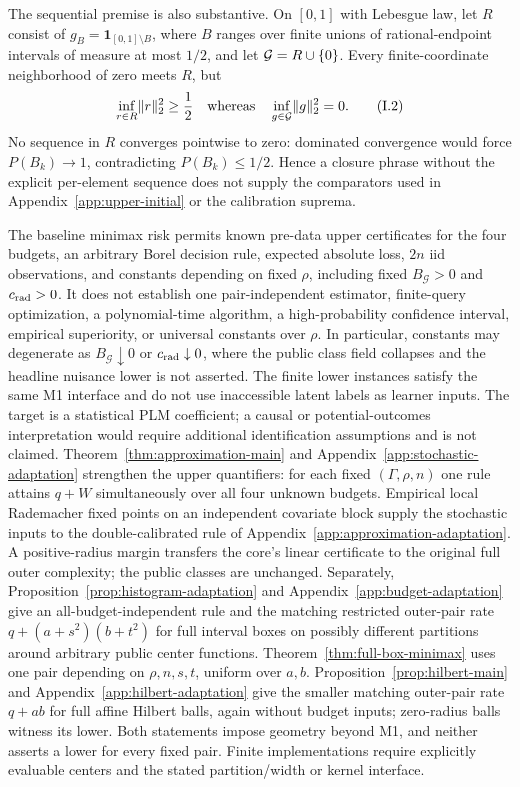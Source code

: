 The sequential premise is also substantive.  On \([0,1]\) with Lebesgue
law, let \(R\) consist of \(g_B=\mathbf 1_{[0,1]\setminus B}\), where \(B\)
ranges over finite unions of rational-endpoint intervals of measure at most
\(1/2\), and let \(\mathcal G=R\cup\{0\}\).  Every finite-coordinate neighborhood
of zero meets \(R\), but
\[
 \inf_{r\in R}\lVert r\rVert_2^2\ge\frac12
 \quad\text{whereas}\quad
 \inf_{g\in\mathcal G}\lVert g\rVert_2^2=0.
 \tag{I.2}
\]
No sequence in \(R\) converges pointwise to zero: dominated convergence would
force \(P(B_k)\to1\), contradicting \(P(B_k)\le1/2\).  Hence a closure phrase
without the explicit per-element sequence does not supply the comparators
used in Appendix~\ref{app:upper-initial} or the calibration suprema.

The baseline minimax risk permits known pre-data upper certificates for the four budgets, an arbitrary Borel decision rule,
expected absolute loss, \(2n\) iid observations, and constants depending on
fixed \(\rho\), including fixed \(B_{\mathcal G}>0\) and
\(c_{\rm rad}>0\).  It does not establish
one pair-independent estimator, finite-query optimization,
a polynomial-time algorithm, a high-probability confidence interval,
empirical superiority, or universal constants over \(\rho\).  In particular,
constants may degenerate as \(B_{\mathcal G}\downarrow0\) or
\(c_{\rm rad}\downarrow0\), where the public class field collapses and the
headline nuisance lower is not asserted.  The finite lower
instances satisfy the same M1 interface and do not use inaccessible latent
labels as learner inputs.  The target is a statistical PLM coefficient; a
causal or potential-outcomes interpretation would require additional
identification assumptions and is not claimed.
Theorem~\ref{thm:approximation-main} and
Appendix~\ref{app:stochastic-adaptation} strengthen the upper quantifiers:
for each fixed $(\Gamma,\rho,n)$ one rule attains $q+W$ simultaneously
over all four unknown budgets. Empirical local Rademacher fixed points
on an independent covariate block supply the stochastic inputs to the
double-calibrated rule of Appendix~\ref{app:approximation-adaptation}.
A positive-radius margin transfers the core's linear certificate to
the original full outer complexity; the public classes are unchanged.
Separately,
Proposition~\ref{prop:histogram-adaptation} and Appendix~\ref{app:budget-adaptation}
give an all-budget-independent rule and the matching restricted outer-pair
rate \(q+(a+s^2)(b+t^2)\) for full interval boxes on possibly different
partitions around arbitrary public center functions. Theorem~\ref{thm:full-box-minimax}
uses one pair depending on \(\rho,n,s,t\), uniform over \(a,b\).
Proposition~\ref{prop:hilbert-main} and Appendix~\ref{app:hilbert-adaptation}
give the smaller matching outer-pair rate \(q+ab\) for full affine Hilbert
balls, again without budget inputs; zero-radius balls witness its lower.
Both statements impose geometry beyond M1, and neither asserts a lower
for every fixed pair. Finite implementations require explicitly evaluable
centers and the stated partition/width or kernel interface.


